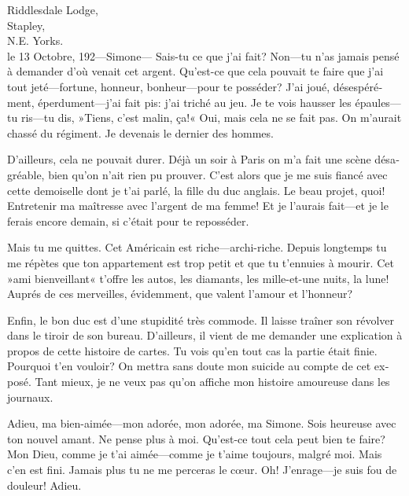 \begin{french}
\begin{mail}{Riddlesdale Lodge,\\Stapley,\\N\@.E\@. Yorks.\\le 13 Octobre, 192—}{Simone---}
Sais-tu ce que j'ai fait? Non—tu n'as jamais pensé à demander d'où venait cet argent. Qu'est-ce que cela pouvait te faire que j'ai tout jeté—fortune, honneur, bonheur—pour te posséder? J'ai joué, désespérément, éperdument—j'ai fait pis: j'ai triché au jeu. Je te vois hausser les épaules—tu ris—tu dis, »Tiens, c'est malin, ça!« Oui, mais cela ne se fait pas. On m'aurait chassé du régiment. Je devenais le dernier des hommes.

D'ailleurs, cela ne pouvait durer. Déjà un soir à Paris on m'a fait une scène désagréable, bien qu'on n'ait rien pu prouver. C'est alors que je me suis fiancé avec cette demoiselle dont je t'ai parlé, la fille du duc anglais. Le beau projet, quoi! Entretenir ma maîtresse avec l'argent de ma femme! Et je l'aurais fait—et je le ferais encore demain, si c'était pour te reposséder.

Mais tu me quittes. Cet Américain est riche—archi-riche. Depuis longtemps tu me répètes que ton appartement est trop petit et que tu t'ennuies à mourir. Cet »ami bienveillant« t'offre les autos, les diamants, les mille-et-une nuits, la lune! Auprés de ces merveilles, évidemment, que valent l'amour et l'honneur?

Enfin, le bon duc est d'une stupidité très commode. Il laisse traîner son révolver dans le tiroir de son bureau. D'ailleurs, il vient de me demander une explication à propos de cette histoire de cartes. Tu vois qu'en tout cas la partie était finie. Pourquoi t'en vouloir? On mettra sans doute mon suicide au compte de cet exposé. Tant mieux, je ne veux pas qu'on affiche mon histoire amoureuse dans les journaux.

Adieu, ma bien-aimée—mon adorée, mon adorée, ma Simone. Sois heureuse avec ton nouvel amant. Ne pense plus à moi. Qu'est-ce tout cela peut bien te faire? Mon Dieu, comme je t'ai aimée—comme je t'aime toujours, malgré moi. Mais c'en est fini. Jamais plus tu ne me perceras le cœur. Oh! J'enrage—je suis fou de douleur! Adieu.

	\begin{letter}
		\vspace{-0.5em}
	\end{letter}

	\end{mail}
\end{french}


\begin{a4}
	\clearpage
\end{a4}


